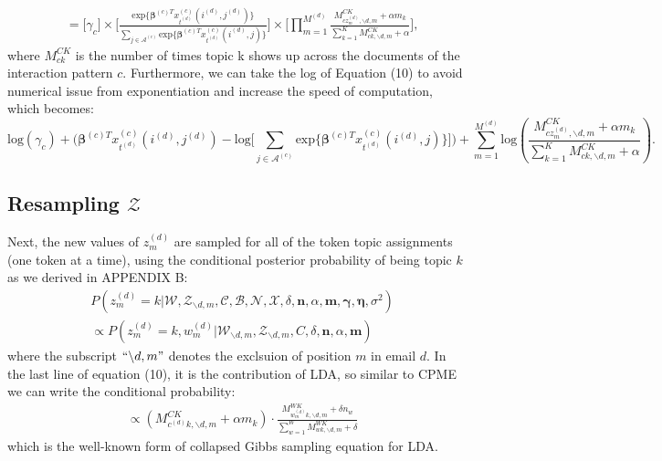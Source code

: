 \documentclass[a4paper]{article}
\begin{document}
   \begin{equation}
   \begin{aligned} &=\Big[ \gamma_{c}\Big]\times\Big[ \frac{\mbox{exp}\{\boldsymbol{\beta}^{(c)T}x^{(c)}_{t^{(d)}}(i^{(d)}, j^{(d)})\}}{\sum_{j\in \mathcal{A}^{(c)}} \mbox{exp}\{\boldsymbol{\beta}^{(c)T}x^{(c)}_{t^{(d)}}(i^{(d)}, j)\}}\Big]\times\Big[\prod_{m=1}^{M^{(d)}}
    \frac{M^{CK}_{cz_m^{(d)}, \backslash d, m}+\alpha m_k}{\sum_{k=1}^KM^{CK}_{ck, \backslash d, m}+\alpha}\Big],
   \end{aligned}
   \end{equation}
where $M^{CK}_{ck}$ is the number of times topic k shows up across the documents of  the interaction pattern $c$. Furthermore, we can take the log of Equation (10) to avoid numerical issue from exponentiation and increase the speed of computation, which becomes:
  	 \begin{equation}
\mbox{log}(\gamma_{c})+\Big(\boldsymbol{\beta}^{(c)T}x^{(c)}_{t^{(d)}}(i^{(d)}, j^{(d)})-\mbox{log}\big[\sum_{j\in \mathcal{A}^{(c)}}\mbox{exp}\{\boldsymbol{\beta}^{(c)T}x^{(c)}_{t^{(d)}}(i^{(d)}, j)\}\big]\Big)+\sum_{m=1}^{M^{(d)}}\mbox{log}(\frac{M^{CK}_{cz_m^{(d)}, \backslash d, m}+\alpha m_k}{\sum_{k=1}^KM^{CK}_{ck, \backslash d, m}+\alpha}).
  	 \end{equation}
  \subsection{Resampling $\mathcal{Z}$}
Next, the new values of $z^{(d)}_m$ are sampled for all of the token topic assignments (one token at a time), using the conditional posterior probability of being topic $k$ as we derived in APPENDIX B:
\begin{equation}
\begin{aligned} & 
 P(z^{(d)}_m=k|\mathcal{W}, \mathcal{Z}_{\backslash d, m},  \mathcal{C}, \mathcal{B}, \mathcal{N}, \mathcal{X}, \delta, \boldsymbol{n}, \alpha, \boldsymbol{m}, \boldsymbol{\gamma}, \boldsymbol{\eta}, \sigma^2)\\
& \propto P(z^{(d)}_m=k, w^{(d)}_m|\mathcal{W}_{\backslash d, m}, \mathcal{Z}_{\backslash d,m}, C, \delta, \boldsymbol{n}, \alpha, \boldsymbol{m})
\end{aligned}
\end{equation}
where the subscript $``{\backslash d, m}"$ denotes the exclsuion of position $m$ in email $d$. In the last line of equation (10), it is the contribution of LDA, so similar to CPME we can write the conditional probability:
	\begin{equation}
	\begin{aligned} 
	& \propto(M^{CK}_{c^{(d)}k, \backslash d, m}+\alpha m_k)\cdot\frac{M_{w_m^{(d)}k, \backslash d, m}^{WK}+\delta n_w}{\sum_{w=1}^WM_{wk,  \backslash d, m}^{WK}+\delta}
	\end{aligned}
	\end{equation}
	which is the well-known form of collapsed Gibbs sampling equation for LDA.
\end{document}
